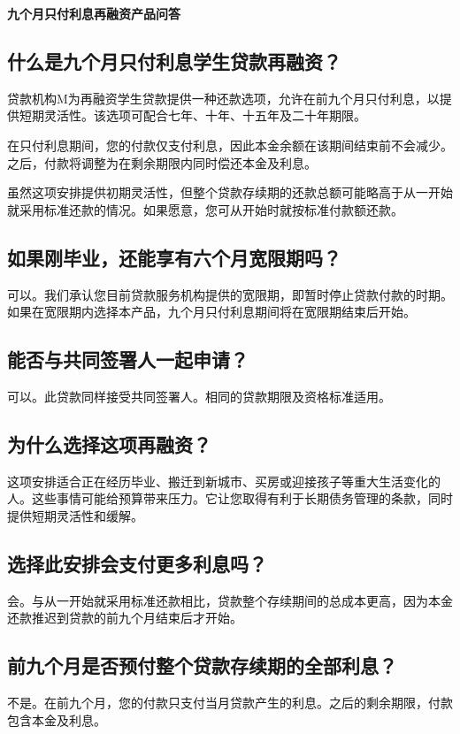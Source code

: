 \documentclass[UTF8,fontset=none,11pt,a4paper]{ctexart}
\begin{document}
{\noindent\fontsize{20}{25}\selectfont\bfseries 九个月只付利息再融资产品问答\par}
\vspace{10pt}
\subsection*{什么是九个月只付利息学生贷款再融资？}
贷款机构M为再融资学生贷款提供一种还款选项，允许在前九个月只付利息，以提供短期灵活性。该选项可配合七年、十年、十五年及二十年期限。


在只付利息期间，您的付款仅支付利息，因此本金余额在该期间结束前不会减少。之后，付款将调整为在剩余期限内同时偿还本金及利息。


虽然这项安排提供初期灵活性，但整个贷款存续期的还款总额可能略高于从一开始就采用标准还款的情况。如果愿意，您可从开始时就按标准付款额还款。


\subsection*{如果刚毕业，还能享有六个月宽限期吗？}
可以。我们承认您目前贷款服务机构提供的宽限期，即暂时停止贷款付款的时期。如果在宽限期内选择本产品，九个月只付利息期间将在宽限期结束后开始。


\subsection*{能否与共同签署人一起申请？}
可以。此贷款同样接受共同签署人。相同的贷款期限及资格标准适用。


\subsection*{为什么选择这项再融资？}
这项安排适合正在经历毕业、搬迁到新城市、买房或迎接孩子等重大生活变化的人。这些事情可能给预算带来压力。它让您取得有利于长期债务管理的条款，同时提供短期灵活性和缓解。


\subsection*{选择此安排会支付更多利息吗？}
会。与从一开始就采用标准还款相比，贷款整个存续期间的总成本更高，因为本金还款推迟到贷款的前九个月结束后才开始。


\subsection*{前九个月是否预付整个贷款存续期的全部利息？}
不是。在前九个月，您的付款只支付当月贷款产生的利息。之后的剩余期限，付款包含本金及利息。
\end{document}
